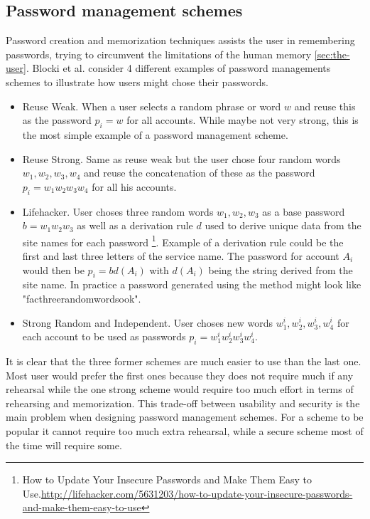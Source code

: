 \subsection{Password management schemes}
 
Password creation and memorization techniques assists the user in remembering passwords, trying to circumvent the limitations of the human memory \autoref{sec:the-user}. Blocki et al. \cite{naturally-rehearsing} consider 4 different examples of password managements schemes to illustrate how users might chose their passwords.
\begin{itemize}
    \item{ Reuse Weak. } When a user selects a random phrase or word $w$ and reuse this as the password $p_i=w$ for all accounts. While maybe not very strong, this is the most simple example of a password management scheme.
    \item{ Reuse Strong. } Same as reuse weak but the user chose four random words $w_1,w_2,w_3,w_4$ and reuse the concatenation of these as the password $p_i = w_1w_2w_3w_4$ for all his accounts.
    \item{Lifehacker.} User choses three random words $w_1, w_2, w_3$ as a base password $b=w_1w_2w_3$ as well as a derivation rule $d$ used to derive unique data from the site names for each password \footnote{How to Update Your Insecure Passwords and Make Them Easy to Use.\url{http://lifehacker.com/5631203/how-to-update-your-insecure-passwords-and-make-them-easy-to-use}}. Example of a derivation rule could be the first and last three letters of the service name. The password for account $A_i$ would then be $p_i = b d(A_i)$ with $d(A_i)$ being the string derived from the site name. In practice a password generated using the method might look like "facthreerandomwordsook". 
    \item{Strong Random and Independent.} User choses new words $w^i_1, w^i_2, w^i_3, w^i_4$ for each account to be used as passwords $p_i = w^i_1w^i_2w^i_3w^i_4$.
\end{itemize}
It is clear that the three former schemes are much easier to use than the last one. Most user would prefer the first ones because they does not require much if any rehearsal while the one strong scheme would require too much effort in terms of rehearsing and memorization. This trade-off between usability and security is the main problem when designing password management schemes. For a scheme to be popular it cannot require too much extra rehearsal, while a secure scheme most of the time will require some.



